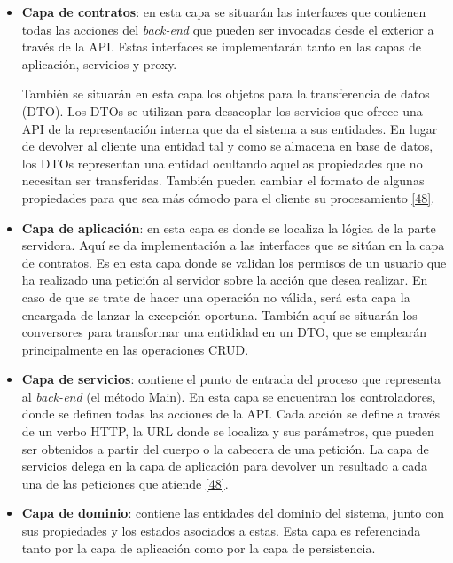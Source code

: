 \documentclass[11pt,spanish,listoffigures]{tfgetsinf}
\begin{document}
\begin{itemize}

\item \textbf{Capa de contratos}: en esta capa se situarán las interfaces que contienen todas las acciones del \textit{back-end} que pueden ser invocadas desde el exterior a través de la API. Estas interfaces se implementarán tanto en las capas de aplicación, servicios y proxy. 

También se situarán en esta capa los objetos para la transferencia de datos (DTO). Los DTOs se utilizan para desacoplar los servicios que ofrece una API de la representación interna que da el sistema a sus entidades. En lugar de devolver al cliente una entidad tal y como se almacena en base de datos, los DTOs representan una entidad ocultando aquellas propiedades que no necesitan ser transferidas. También pueden cambiar el formato de algunas propiedades para que sea más cómodo para el cliente su procesamiento \hyperlink{page.80}{[48]}.

\item \textbf{Capa de aplicación}: en esta capa es donde se localiza la lógica de la parte servidora. Aquí se da implementación a las interfaces que se sitúan en la capa de contratos. Es en esta capa donde se validan los permisos de un usuario que ha realizado una petición al servidor sobre la acción que desea realizar. En caso de que se trate de hacer una operación no válida, será esta capa la encargada de lanzar la excepción oportuna. También aquí se situarán los conversores para transformar una entididad en un DTO, que se emplearán principalmente en las operaciones CRUD.

\item \textbf{Capa de servicios}: contiene el punto de entrada del proceso que representa al \textit{back-end} (el método Main). En esta capa se encuentran los controladores, donde se definen todas las acciones de la API. Cada acción se define a través de un verbo HTTP, la URL donde se localiza y sus parámetros, que pueden ser obtenidos a partir del cuerpo o la cabecera de una petición. La capa de servicios delega en la capa de aplicación para devolver un resultado a cada una de las peticiones que atiende \hyperlink{page.80}{[48]}.

\item \textbf{Capa de dominio}: contiene las entidades del dominio del sistema, junto con sus propiedades y los estados asociados a estas. Esta capa es referenciada tanto por la capa de aplicación como por la capa de persistencia.


\end{itemize}
\end{document}
